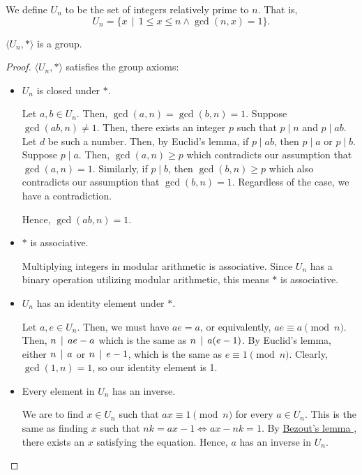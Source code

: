     \begin{dfn}
        We define \(U_n\) to be the set of integers relatively prime to \(n\). That is, \[U_n = \{x \,\mid\, 1 \leq x \leq n \land \gcd(n, x) = 1\}.\]
    \end{dfn}

    \begin{thm}
        \(\langle U_n, *\rangle\) is a group.
    \end{thm}

    \begin{proof}
        \(\langle U_n, *\rangle\) satisfies the group axioms:
        \begin{itemize}
            \item \(U_n\) is closed under \(*\).

            Let \(a, b\in U_n\). Then, \(\gcd(a, n) = \gcd(b, n) = 1\). Suppose \(\gcd(ab, n) \neq 1\). Then, there exists an integer \(p\) such that \(p \mid n\) and \(p \mid ab\). Let \(d\) be such a number. Then, by Euclid's lemma, if \(p \mid ab\), then \(p \mid a\) or \(p \mid b\). Suppose \(p \mid a\). Then, \(\gcd(a, n) \geq p\) which contradicts our assumption that \(\gcd(a, n) = 1\). Similarly, if \(p \mid b\), then \(\gcd(b, n) \geq p\) which also contradicts our assumption that \(\gcd(b, n) = 1\). Regardless of the case, we have a contradiction.

            Hence, \(\gcd(ab, n) = 1\).

            \item \(*\) is associative.

            Multiplying integers in modular arithmetic is associative. Since \(U_n\) has a binary operation utilizing modular arithmetic, this means \(*\) is associative.

            \item \(U_n\) has an identity element under \(*\).

            Let \(a, e\in U_n\). Then, we must have \(ae = a\), or equivalently, \(ae \equiv a \pmod{n}\). Then, \(n \,\mid\, ae - a\) which is the same as \(n \,\mid\, a(e - 1)\). By Euclid's lemma, either \(n \,\mid\, a\) or \(n \,\mid\, e - 1\), which is the same as \(e \equiv 1 \pmod{n}\). Clearly, \(\gcd(1, n) = 1\), so our identity element is 1.

            \item Every element in \(U_n\) has an inverse.

            We are to find \(x\in U_n\) such that \(ax \equiv 1 \pmod{n}\) for every \(a\in U_n\). This is the same as finding \(x\) such that \(nk = ax - 1 \iff ax - nk = 1\). By \href{https://en.wikipedia.org/wiki/B%C3%A9zout%27s_identity}{Bezout's lemma \ExternalLink}, there exists an \(x\) satisfying the equation. Hence, \(a\) has an inverse in \(U_n\).
        \end{itemize}
    \end{proof}


